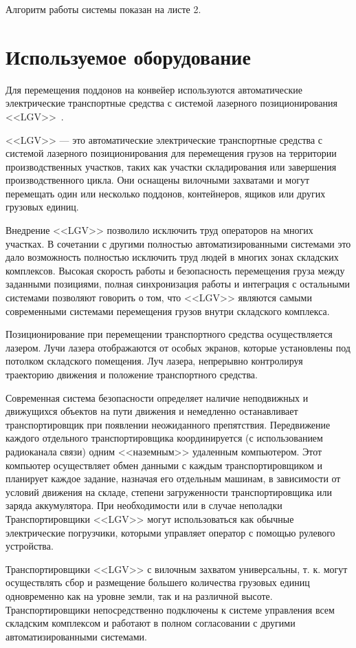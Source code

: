 Алгоритм работы системы показан на листе 2.

\section{Используемое оборудование}

Для перемещения поддонов на конвейер используются автоматические электрические транспортные средства с системой лазерного позиционирования <<LGV>>~\cite{system:logistics}.

<<LGV>> --- это автоматические электрические транспортные средства с системой лазерного позиционирования для перемещения грузов на территории производственных участков, таких как участки складирования или завершения производственного цикла. Они оснащены вилочными захватами и могут перемещать один или несколько поддонов, контейнеров, ящиков или других грузовых единиц.

Внедрение <<LGV>> позволило исключить труд операторов на многих участках. В сочетании с другими полностью автоматизированными системами это дало возможность полностью исключить труд людей в многих зонах складских комплексов. Высокая скорость работы и безопасность перемещения груза между заданными позициями, полная синхронизация работы и интеграция с остальными системами позволяют говорить о том, что <<LGV>> являются самыми современными системами перемещения грузов внутри складского комплекса.

Позиционирование при перемещении транспортного средства осуществляется лазером. Лучи лазера отображаются от особых экранов, которые установлены под потолком складского помещения. Луч лазера, непрерывно контролируя траекторию движения и положение транспортного средства.

Современная система безопасности определяет наличие неподвижных и движущихся объектов на пути движения и немедленно останавливает транспортировщик при появлении неожиданного препятствия. Передвижение каждого отдельного транспортировщика координируется (с использованием радиоканала связи) одним <<наземным>> удаленным компьютером. Этот компьютер осуществляет обмен данными с каждым транспортировщиком и планирует каждое задание, назначая его отдельным машинам, в зависимости от условий движения на складе, степени загруженности транспортировщика или заряда аккумулятора. При необходимости или в случае неполадки Транспортировщики <<LGV>> могут использоваться как обычные электрические погрузчики, которыми управляет оператор с помощью рулевого устройства.

Транспортировщики <<LGV>> с вилочным захватом универсальны, т. к. могут осуществлять сбор и размещение большего количества грузовых единиц одновременно как на уровне земли, так и на различной высоте. Транспортировщики непосредственно подключены к системе управления всем складским комплексом и работают в полном согласовании с другими автоматизированными системами.

